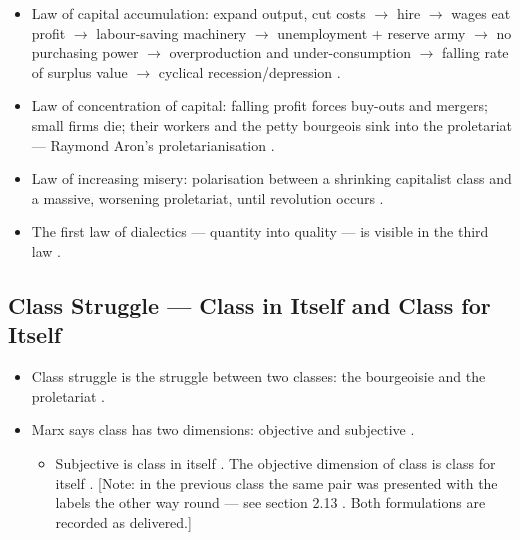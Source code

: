 \begin{QuickRevision}
\begin{itemize}
    \item Law of capital accumulation: expand output, cut costs $\rightarrow$ hire $\rightarrow$ wages eat profit $\rightarrow$ labour-saving machinery $\rightarrow$ unemployment + reserve army $\rightarrow$ no purchasing power $\rightarrow$ overproduction and under-consumption $\rightarrow$ falling rate of surplus value $\rightarrow$ cyclical recession/depression .
    \item Law of concentration of capital: falling profit forces buy-outs and mergers; small firms die; their workers and the petty bourgeois sink into the proletariat --- Raymond Aron's proletarianisation .
    \item Law of increasing misery: polarisation between a shrinking capitalist class and a massive, worsening proletariat, until revolution occurs .
    \item The first law of dialectics --- quantity into quality --- is visible in the third law .
\end{itemize}
\end{QuickRevision}

\subsection{Class Struggle --- Class in Itself and Class for Itself}\label{sec:class-in-for-itself}
\begin{itemize}
    \item Class struggle is the struggle between two classes: the bourgeoisie and the proletariat .
    \item Marx says class has two dimensions: objective and subjective .
    \begin{itemize}
        \item Subjective is class in itself . The objective dimension of class is class for itself . [Note: in the previous class the same pair was presented with the labels the other way round --- see section 2.13 . Both formulations are recorded as delivered.] 
    \end{itemize}
\end{itemize}


